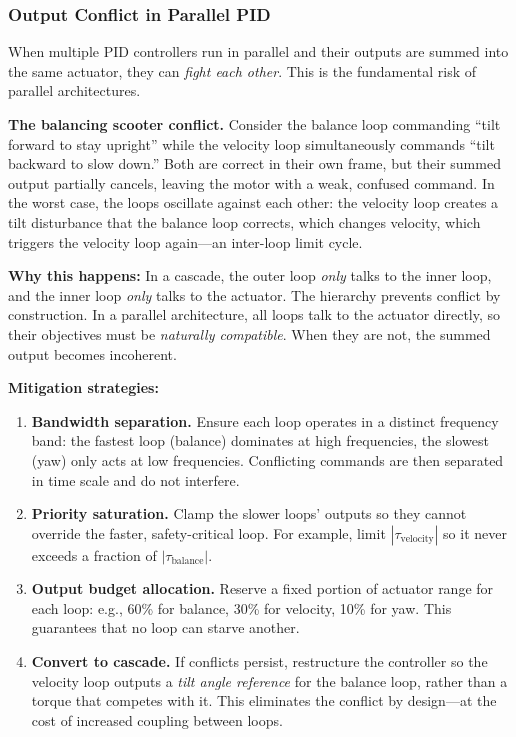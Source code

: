 \subsubsection{Output Conflict in Parallel PID}

When multiple PID controllers run in parallel and their outputs are summed into the same actuator, they can \textit{fight each other}. This is the fundamental risk of parallel architectures.

\textbf{The balancing scooter conflict.} Consider the balance loop commanding ``tilt forward to stay upright'' while the velocity loop simultaneously commands ``tilt backward to slow down.'' Both are correct in their own frame, but their summed output partially cancels, leaving the motor with a weak, confused command. In the worst case, the loops oscillate against each other: the velocity loop creates a tilt disturbance that the balance loop corrects, which changes velocity, which triggers the velocity loop again---an inter-loop limit cycle.

\textbf{Why this happens:} In a cascade, the outer loop \textit{only} talks to the inner loop, and the inner loop \textit{only} talks to the actuator. The hierarchy prevents conflict by construction. In a parallel architecture, all loops talk to the actuator directly, so their objectives must be \textit{naturally compatible}. When they are not, the summed output becomes incoherent.

\textbf{Mitigation strategies:}
\begin{enumerate}[nosep]
    \item \textbf{Bandwidth separation.} Ensure each loop operates in a distinct frequency band: the fastest loop (balance) dominates at high frequencies, the slowest (yaw) only acts at low frequencies. Conflicting commands are then separated in time scale and do not interfere.
    \item \textbf{Priority saturation.} Clamp the slower loops' outputs so they cannot override the faster, safety-critical loop. For example, limit $|\tau_{\text{velocity}}|$ so it never exceeds a fraction of $|\tau_{\text{balance}}|$.
    \item \textbf{Output budget allocation.} Reserve a fixed portion of actuator range for each loop: e.g., 60\% for balance, 30\% for velocity, 10\% for yaw. This guarantees that no loop can starve another.
    \item \textbf{Convert to cascade.} If conflicts persist, restructure the controller so the velocity loop outputs a \textit{tilt angle reference} for the balance loop, rather than a torque that competes with it. This eliminates the conflict by design---at the cost of increased coupling between loops.
\end{enumerate}

